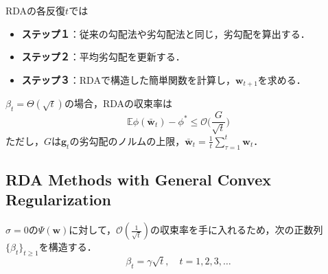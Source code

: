 \documentclass[a4paper,11pt]{jsarticle}
\numberwithin{theorem}{section}  %
\numberwithin{equation}{section} %
\begin{document}
RDAの各反復$t$では
\begin{itemize}
\item {\bf ステップ１}：従来の勾配法や劣勾配法と同じ，劣勾配を算出する．
\item {\bf ステップ２}：平均劣勾配を更新する．
\item {\bf ステップ３}：RDAで構造した簡単関数を計算し，$\bm{w}_{t+1}$を求める．
\end{itemize}

$\beta_t = \Theta(\sqrt{t})$の場合，RDAの収束率は
\begin{equation}
\mathbb{E} \phi(\bar{\bm{w}}_t) - \phi^* \le \mathcal{O}\Bigr( \frac{G}{\sqrt{t}} \Bigr)
\end{equation}
ただし，$G$は$\bm{g}_t$の劣勾配のノルムの上限，$\bar{\bm{w}}_t = \frac{1}{t} \sum_{\tau=1}^t \bm{w}_t$．

\subsection{RDA Methods with General Convex Regularization}

$\sigma =0$の$\Psi(\bm{w})$に対して，$\mathcal{O}(\frac{1}{\sqrt{t}})$の収束率を手に入れるため，次の正数列$\{ \beta_t \}_{t\ge1}$を構造する．
\begin{equation}
\beta_t = \gamma\sqrt{t},\,\,\,\,\,\,t=1,2,3,\dots \label{Beta}
\end{equation}
\end{document}
